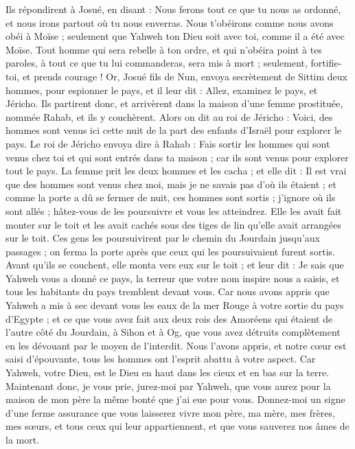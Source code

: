 \begin{multicols}{2}
Ils répondirent à Josué, en disant : Nous ferons tout ce que tu nous as ordonné, et nous irons partout où tu nous enverras.
Nous t’obéirons comme nous avons obéi à Moïse ; seulement que Yahweh ton Dieu soit avec toi, comme il a été avec Moïse.
Tout homme qui sera rebelle à ton ordre, et qui n’obéira point à tes paroles, à tout ce que tu lui commanderas, sera mis à mort ; seulement, fortifie-toi, et prends courage !
\VerseOne{}Or, Josué fils de Nun, envoya secrètement de Sittim deux hommes, pour espionner le pays, et il leur dit : Allez, examinez le pays, et Jéricho. Ils partirent donc, et arrivèrent dans la maison d’une femme prostituée, nommée Rahab\FTNT{}, et ils y couchèrent.
Alors on dit au roi de Jéricho : Voici, des hommes sont venus ici cette nuit de la part des enfants d’Israël pour explorer le pays.
Le roi de Jéricho envoya dire à Rahab : Fais sortir les hommes qui sont venus chez toi et qui sont entrés dans ta maison ; car ils sont venus pour explorer tout le pays.
La femme prit les deux hommes et les cacha ; et elle dit : Il est vrai que des hommes sont venus chez moi, mais je ne savais pas d’où ils étaient ;
et comme la porte a dû se fermer de nuit, ces hommes sont sortis ; j’ignore où ils sont allés ; hâtez-vous de les poursuivre et vous les atteindrez.
Elle les avait fait monter sur le toit et les avait cachés sous des tiges de lin qu’elle avait arrangées sur le toit.
Ces gens les poursuivirent par le chemin du Jourdain jusqu’aux passages ; on ferma la porte après que ceux qui les poursuivaient furent sortis.
Avant qu’ils se couchent, elle monta vers eux sur le toit ;
et leur dit : Je sais que Yahweh vous a donné ce pays, la terreur que votre nom inspire nous a saisis, et tous les habitants du pays tremblent devant vous.
Car nous avons appris que Yahweh a mis à sec devant vous les eaux de la mer Rouge à votre sortie du pays d’Egypte ; et ce que vous avez fait aux deux rois des Amoréens qui étaient de l’autre côté du Jourdain, à Sihon et à Og, que vous avez détruits complètement en les dévouant par le moyen de l'interdit.
Nous l’avons appris, et notre cœur est saisi d’épouvante, tous les hommes ont l’esprit abattu à votre aspect. Car Yahweh, votre Dieu, est le Dieu en haut dans les cieux et en bas sur la terre.
Maintenant donc, je vous prie, jurez-moi par Yahweh, que vous aurez pour la maison de mon père la même bonté que j’ai eue pour vous.
Donnez-moi un signe\FTNT{} d’une ferme assurance que vous laisserez vivre mon père, ma mère, mes frères, mes sœurs, et tous ceux qui leur appartiennent, et que vous sauverez nos âmes de la mort.

\end{multicols}

